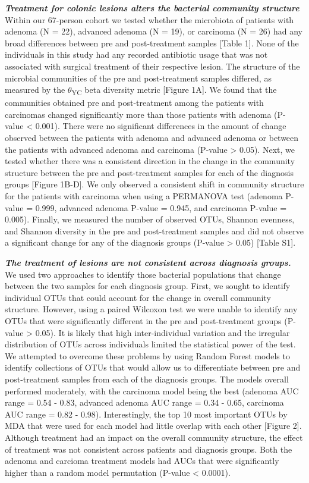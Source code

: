 \documentclass[12pt,]{article}
\begin{document}
\textbf{\emph{Treatment for colonic lesions alters the bacterial
community structure}} Within our 67-person cohort we tested whether the
microbiota of patients with adenoma (N = 22), advanced adenoma (N = 19),
or carcinoma (N = 26) had any broad differences between pre and
post-treatment samples {[}Table 1{]}. None of the individuals in this
study had any recorded antibiotic usage that was not associated with
surgical treatment of their respective lesion. The structure of the
microbial communities of the pre and post-treatment samples differed, as
measured by the \(\theta\)\textsubscript{YC} beta diversity metric
{[}Figure 1A{]}. We found that the communities obtained pre and
post-treatment among the patients with carcinomas changed significantly
more than those patients with adenoma (P-value \textless{} 0.001). There
were no significant differences in the amount of change observed between
the patients with adenoma and advanced adenoma or between the patients
with advanced adenoma and carcinoma (P-value \textgreater{} 0.05). Next,
we tested whether there was a consistent direction in the change in the
community structure between the pre and post-treatment samples for each
of the diagnosis groups {[}Figure 1B-D{]}. We only observed a consistent
shift in community structure for the patients with carcinoma when using
a PERMANOVA test (adenoma P-value = 0.999, advanced adenoma P-value =
0.945, and carcinoma P-value = 0.005). Finally, we measured the number
of observed OTUs, Shannon evenness, and Shannon diversity in the pre and
post-treatment samples and did not observe a significant change for any
of the diagnosis groups (P-value \textgreater{} 0.05) {[}Table S1{]}.

\textbf{\emph{The treatment of lesions are not consistent across
diagnosis groups.}} We used two approaches to identify those bacterial
populations that change between the two samples for each diagnosis
group. First, we sought to identify individual OTUs that could account
for the change in overall community structure. However, using a paired
Wilcoxon test we were unable to identify any OTUs that were
significantly different in the pre and post-treatment groups (P-value
\textgreater{} 0.05). It is likely that high inter-individual variation
and the irregular distribution of OTUs across individuals limited the
statistical power of the test. We attempted to overcome these problems
by using Random Forest models to identify collections of OTUs that would
allow us to differentiate between pre and post-treatment samples from
each of the diagnosis groups. The models overall performed moderately,
with the carcinoma model being the best (adenoma AUC range = 0.54 -
0.83, advanced adenoma AUC range = 0.34 - 0.65, carcinoma AUC range =
0.82 - 0.98). Interestingly, the top 10 most important OTUs by MDA that
were used for each model had little overlap with each other {[}Figure
2{]}. Although treatment had an impact on the overall community
structure, the effect of treatment was not consistent across patients
and diagnosis groups. Both the adenoma and carcioma treatment models had
AUCs that were significantly higher than a random model permutation
(P-value \textless{} 0.0001).
\end{document}
